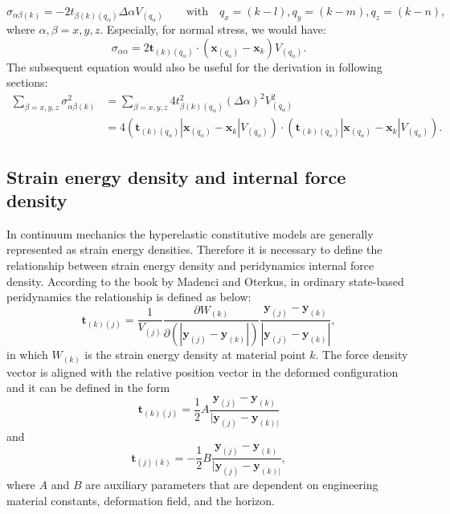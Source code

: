 \documentclass[11pt,fullpage]{article}
\newcommand{\mb}[1]{\mathbf{#1}}
\newcommand{\blue}[1]{#1}
\begin{document}
\begin{equation}
\sigma_{\alpha\beta(k)} = -2t_{\beta(k)(q_\alpha)}\Delta\alpha V_{(q_\alpha)}\qquad \mathrm{with } \quad q_x=(k-l),q_y=(k-m),q_z=(k-n),
\label{eq:8}
\end{equation}
where $\alpha,\beta=x,y,z$. Especially, for normal stress, we would have:
\begin{equation}
\sigma_{\alpha\alpha} = 2 \mb{t}_{(k)(q_\alpha)}\cdot(\mb{x}_{(q_\alpha)}-\mb{x}_{k})V_{(q_\alpha)}.
\label{eq:9}
\end{equation}
The subsequent equation would also be useful for the derivation in following sections:
\begin{equation}
\begin{aligned}
\sum_{\beta=x,y,z}\sigma_{\alpha\beta(k)}^2 &= \sum_{\beta=x,y,z}4t_{\beta(k)(q_\alpha)}^2(\Delta\alpha)^2 V_{(q_\alpha)}^2 \\
                                            &= 4(\mb{t}_{(k)(q_\alpha)}|\mb{x}_{(q_\alpha)}-\mb{x}_{k}|V_{(q_\alpha)})
                                                 \cdot
                                                (\mb{t}_{(k)(q_\alpha)}|\mb{x}_{(q_\alpha)}-\mb{x}_{k}|V_{(q_\alpha)}).
\end{aligned}
\label{eq:10}
\end{equation}

\subsection{Strain energy density and internal force density}

In continuum mechanics the hyperelastic constitutive models are generally represented as strain energy densities. Therefore it is necessary to define the relationship between strain energy density and peridynamics internal force density. According to the book by Madenci and Oterkus\blue{\cite{madenci2014peridynamic}}, in ordinary state-based peridynamics the relationship is defined as below:
\begin{equation}
\mb{t}_{(k)(j)}=\frac{1}{V_{(j)}}\frac{\partial W_{(k)}}{\partial (|\mb{y}_{(j)}-\mb{y}_{(k)}|)}\frac{\mb{y}_{(j)}-\mb{y}_{(k)}}{|\mb{y}_{(j)}-\mb{y}_{(k)}|},
\label{eq:11}
\end{equation}
in which $W_{(k)}$ is the strain energy density at material point $k$. The force density vector is aligned with the relative position vector in the deformed configuration and it can be defined in the form
\begin{equation}
\mb{t}_{(k)(j)} = \frac{1}{2}A\frac{\mb{y}_{(j)}-\mb{y}_{(k)}}{|\mb{y}_{(j)}-\mb{y}_{(k)|}}
\label{eq:12}
\end{equation}
and
\begin{equation}
\mb{t}_{(j)(k)} = -\frac{1}{2}B\frac{\mb{y}_{(j)}-\mb{y}_{(k)}}{|\mb{y}_{(j)}-\mb{y}_{(k)|}},
\label{eq:13}
\end{equation}
where $A$ and $B$ are auxiliary parameters that are dependent on engineering material constants, deformation field, and the horizon.
\end{document}

